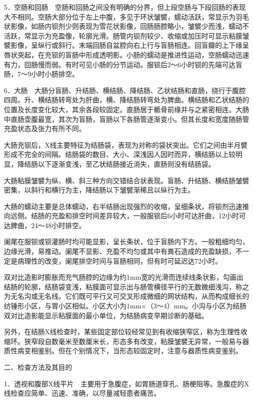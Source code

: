 5．空肠和回肠　空肠和回肠之间没有明确的分界，但上段空肠与下段回肠的表现大不相同。空肠大部分位于左上中腹，多见于环状皱襞，蠕动活跃，常显示为羽毛状影像，如肠内钡剂少则表现为雪花状影像，回肠肠腔略小，皱襞少而浅，蠕动不活跃，常显示为充盈像，轮廓光滑。肠管内钡剂较少、收缩或加压时可显示粘膜皱襞影像，呈纵行或斜行。末端回肠自盆腔向右上行与盲肠相连。回盲瓣的上下缘呈唇状突起，在充钡的盲肠中形成透明影。小肠的蠕动是推进性运动，空肠蠕动迅速有力，回肠慢而弱。有时可见小肠的分节运动。服钡后2～6小时钡的先端可达盲肠，7～9小时小肠排空。

6．大肠　大肠分盲肠、升结肠、横结肠、降结肠、乙状结肠和直肠，绕行于腹腔四周。升、横结肠转弯处为肝曲，横、降结肠转弯处为脾曲。横结肠和乙状结肠的位置及长度变化较大，其余各段较固定。直肠居于骶骨前缘并与之紧密相连。大肠中直肠壶腹最宽，其次为盲肠，盲肠以下各肠管逐渐变小。但其长度和宽度随肠管充盈状态及张力有所不同。

大肠充钡后，X线主要特征为结肠袋，表现为对称的袋状突出。它们之间由半月襞形成不完全的间隔。结肠袋的数目、大小、深浅因人因时而异，横结肠以上较明显，降结肠以下逐渐变浅，至乙状结肠接近消失，直肠则没有结肠袋。

大肠粘膜皱襞为纵、横、斜三种方向交错结合状表现。盲肠、升结肠、横结肠皱襞密集，以斜行和横行为主，降结肠以下皱襞渐稀且以纵行为主。

大肠的蠕动主要是总体蠕动，右半结肠出现强烈的收缩，呈细条状，将钡剂迅速推向远侧。结肠的充盈和排空时间差异较大，一般服钡后6小时可达肝曲，12小时可达脾曲，24～48小时排空。

阑尾在服钡或钡灌肠时均可能显影，呈长条状，位于盲肠内下方。一般粗细均匀，边缘光滑，易推动。阑尾不显影、充盈不均匀或其中有粪石造成的充盈缺损，不一定是病理性的改变，阑尾排空时间与盲肠相同，但有时可延迟达72小时。

双对比造影时膨胀而充气肠腔的边缘为约1mm宽的光滑而连续线条状影，勾画出结肠的轮廓，结肠袋变浅，粘膜面可显示出与肠管横径平行的无数微细浅沟，称之为无名沟或无名线。它们既可平行又可交叉形成微细的网状结构，从而构成细长的纺锤形小区，与胃小区相似。小区大小为1mm×（3～4）mm。小沟与小区为结肠双对比造影能显示粘膜面的最小单位，为结肠病变早期诊断的基础。

另外，在结肠X线检查时，某些固定部位较经常见到有收缩狭窄区，称为生理性收缩环。狭窄段自数毫米至数厘米长，形态多有改变，粘膜皱襞无异常，一般易与器质性病变相鉴别。但在个别情况下，当形态较固定时，注意与器质性病变鉴别。

二、检查方法及其目的

1．透视和腹部X线平片　主要用于急腹症，如胃肠道穿孔、肠梗阻等。急腹症的X线检查应简单、迅速、准确，以尽量减轻患者痛苦。

